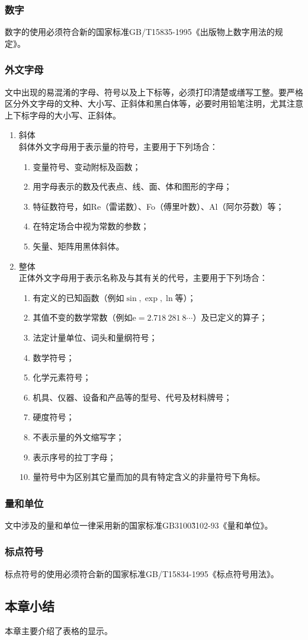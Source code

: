 \subsubsection{数字}

数字的使用必须符合新的国家标准GB/T15835-1995《出版物上数字用法的规定》。

\subsubsection{外文字母}

文中出现的易混淆的字母、符号以及上下标等，必须打印清楚或缮写工整。要严格区分外文字母的文种、大小写、正斜体和黑白体等，必要时用铅笔注明，尤其注意上下标字母的大小写、正斜体。
\begin{enumerate}[label=(\arabic*)]
  \item{斜体\\
  斜体外文字母用于表示量的符号，主要用于下列场合：
  }
  \begin{enumerate}[label=\roman*]
    \item{变量符号、变动附标及函数；}
    \item{用字母表示的数及代表点、线、面、体和图形的字母；}
    \item{特征数符号，如Re（雷诺数）、Fo（傅里叶数）、Al（阿尔芬数）等；}
    \item{在特定场合中视为常数的参数；}
    \item{矢量、矩阵用黑体斜体。}
  \end{enumerate}
  \item{整体\\
  正体外文字母用于表示名称及与其有关的代号，主要用于下列场合：
  }
  \begin{enumerate}[label=\roman*]
    \item{有定义的已知函数（例如$\sin, \exp, \ln$等）；}
    \item{其值不变的数学常数（例如$\mathrm{e}=2.718~281~8\cdots$）及已定义的算子；}
    \item{法定计量单位、词头和量纲符号；}
    \item{数学符号；}
    \item{化学元素符号；}
    \item{机具、仪器、设备和产品等的型号、代号及材料牌号；}
    \item{硬度符号；}
    \item{不表示量的外文缩写字；}
    \item{表示序号的拉丁字母；}
    \item{量符号中为区别其它量而加的具有特定含义的非量符号下角标。}
  \end{enumerate}
\end{enumerate}

\subsubsection{量和单位}

文中涉及的量和单位一律采用新的国家标准GB3100\~ 3102-93《量和单位》。

\subsubsection{标点符号}

标点符号的使用必须符合新的国家标准GB/T15834-1995《标点符号用法》。

\subsection{本章小结}

本章主要介绍了表格的显示。